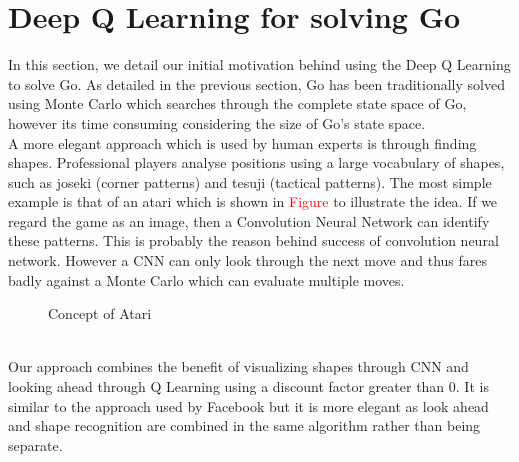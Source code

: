 
\section{Deep Q Learning for solving Go}
In this section, we detail our initial motivation behind using the Deep Q Learning to solve Go. As detailed in the previous section, Go has been traditionally solved using Monte Carlo which searches through the complete state space of Go, however its time consuming considering the size of Go's state space. 
\\
A more elegant approach which is used by human experts is through finding shapes. Professional players analyse positions using a large vocabulary of shapes, such as joseki (corner patterns) and tesuji (tactical patterns). The most simple example is that of an atari which is shown in \textcolor{red}{Figure } to illustrate the idea. If we regard the game as an image, then a Convolution Neural Network can identify these patterns. This is probably the reason behind success of convolution neural network. However a CNN can only look through the next move and thus fares badly against a Monte Carlo which can evaluate multiple moves.
\\
\begin{figure}[h]
	\centering
	\hfill
	\caption{Concept of Atari}
\end{figure}
\\
Our approach combines the benefit of visualizing shapes through CNN and looking ahead through Q Learning using a discount factor greater than 0. It is similar to the approach used by Facebook but it is more elegant as look ahead and shape recognition are combined in the same algorithm rather than being separate.